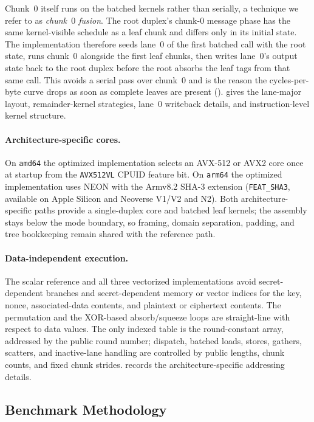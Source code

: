 Chunk~$0$ itself runs on the batched kernels rather than serially, a technique
we refer to as \emph{chunk~$0$ fusion}. The root duplex's chunk-$0$ message phase
has the same kernel-visible schedule as a leaf chunk and differs only in its
initial state. The implementation therefore seeds lane~$0$ of the first batched
call with the root state, runs chunk~$0$ alongside the first leaf chunks, then
writes lane~$0$'s output state back to the root duplex before the root absorbs
the leaf tags from that same call. This avoids a serial pass over chunk~$0$ and
is the reason the cycles-per-byte curve drops as soon as complete leaves are
present ().  gives the lane-major layout,
remainder-kernel strategies, lane~$0$ writeback details, and instruction-level
kernel structure.

\paragraph{Architecture-specific cores.}
On \texttt{amd64} the optimized implementation selects an AVX-512 or AVX2 core
once at startup from the \texttt{AVX512VL} CPUID feature bit. On \texttt{arm64}
the optimized implementation uses NEON with the Armv8.2 SHA-3 extension
(\texttt{FEAT\_SHA3}, available on Apple Silicon and Neoverse V1/V2 and N2).
Both architecture-specific paths provide a single-duplex core and batched leaf
kernels; the assembly stays below the mode boundary, so framing, domain
separation, padding, and tree bookkeeping remain shared with the reference path.

\paragraph{Data-independent execution.}
The scalar reference and all three vectorized implementations avoid
secret-dependent branches and secret-dependent memory or vector indices for the
key, nonce, associated-data contents, and plaintext or ciphertext contents. The
permutation and the XOR-based absorb/squeeze loops are straight-line with
respect to data values. The only indexed table is the round-constant array,
addressed by the public round number; dispatch, batched loads, stores, gathers,
scatters, and inactive-lane handling are controlled by public lengths, chunk
counts, and fixed chunk strides.  records the
architecture-specific addressing details.

\subsection{Benchmark Methodology}
\label{sec:bench-method}

